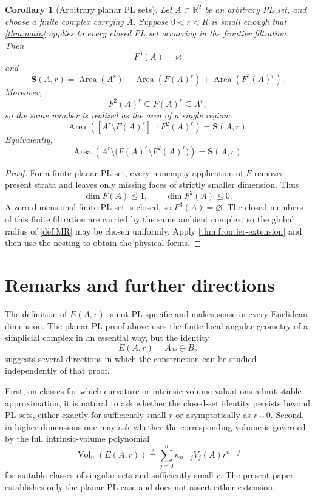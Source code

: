 \documentclass[11pt]{article}
\newtheorem{corollary}[theorem]{Corollary}
\newcommand{\R}{\mathbb R}
\newcommand{\Area}{\operatorname{Area}}
\newcommand{\Vol}{\operatorname{Vol}}
\newcommand{\Steiner}{\mathbf S}
\numberwithin{equation}{section}
\begin{document}
\begin{corollary}[Arbitrary planar PL sets]\label{cor:nonclosed-planar}
Let $A\subset\R^2$ be an arbitrary PL set, and choose a finite complex carrying $\overline A$. Suppose $0<r<R$ is small enough that \cref{thm:main} applies to every closed PL set occurring in the frontier filtration. Then
\[
F^3(A)=\varnothing
\]
and
\begin{equation}\label{eq:planar-frontier-sum}
\boxed{
\Steiner(A,r)
=
\Area(A^r)
-
\Area(F(A)^r)
+
\Area(F^2(A)^r).
}
\end{equation}
Moreover,
\[
F^2(A)^r\subseteq F(A)^r\subseteq A^r,
\]
so the same number is realized as the area of a single region:
\begin{equation}\label{eq:planar-physical-form}
\boxed{
\Area\left(
[A^r\setminus F(A)^r]\sqcup F^2(A)^r
\right)
=
\Steiner(A,r).
}
\end{equation}
Equivalently,
\begin{equation}\label{eq:planar-physical-form2}
\boxed{
\Area\left(
A^r\setminus\bigl(F(A)^r\setminus F^2(A)^r\bigr)
\right)
=
\Steiner(A,r).
}
\end{equation}
\end{corollary}

\begin{proof}
For a finite planar PL set, every nonempty application of $F$ removes present strata and leaves only missing faces of strictly smaller dimension. Thus
\[
\dim F(A)\le1,
\qquad
\dim F^2(A)\le0.
\]
A zero-dimensional finite PL set is closed, so $F^3(A)=\varnothing$. The closed members of this finite filtration are carried by the same ambient complex, so the global radius of \cref{def:MR} may be chosen uniformly. Apply \cref{thm:frontier-extension} and then use the nesting to obtain the physical forms.
\end{proof}
 \section{Remarks and further directions}\label{sec:outlook}

The definition of $E(A,r)$ is not PL-specific and makes sense in every Euclidean dimension. The planar PL proof above uses the finite local angular geometry of a simplicial complex in an essential way, but the identity
\[
E(A,r)=A_{2r}\ominus B_r
\]
suggests several directions in which the construction can be studied independently of that proof.

First, on classes for which curvature or intrinsic-volume valuations admit stable approximation, it is natural to ask whether the closed-set identity persists beyond PL sets, either exactly for sufficiently small $r$ or asymptotically as $r\downarrow0$. Second, in higher dimensions one may ask whether the corresponding volume is governed by the full intrinsic-volume polynomial
\[
\Vol_n(E(A,r))
\stackrel{?}{=}
\sum_{j=0}^{n}\kappa_{n-j}V_j(A)r^{n-j}
\]
for suitable classes of singular sets and sufficiently small $r$. The present paper establishes only the planar PL case and does not assert either extension.
\end{document}
